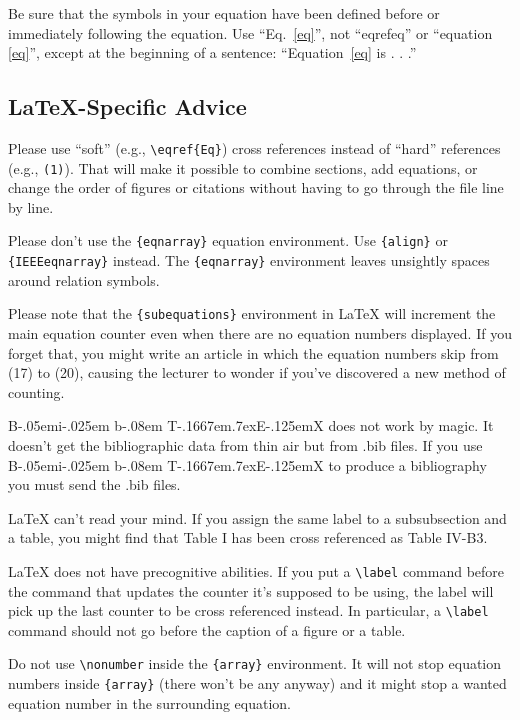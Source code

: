 \documentclass[conference]{IEEEtran}
\def\BibTeX{{\rm B\kern-.05em{\sc i\kern-.025em b}\kern-.08em
    T\kern-.1667em\lower.7ex\hbox{E}\kern-.125emX}}
\begin{document}
Be sure that the symbols in your equation have been defined before or immediately following the equation. Use ``Eq.~\eqref{eq}'', not ``eqref{eq}'' or ``equation \eqref{eq}'', except at 
the beginning of a sentence: ``Equation~\eqref{eq} is . . .''

\subsection{\LaTeX-Specific Advice}

Please use ``soft'' (e.g., \verb|\eqref{Eq}|) cross references instead
of ``hard'' references (e.g., \verb|(1)|). That will make it possible
to combine sections, add equations, or change the order of figures or
citations without having to go through the file line by line.

Please don't use the \verb|{eqnarray}| equation environment. Use
\verb|{align}| or \verb|{IEEEeqnarray}| instead. The \verb|{eqnarray}|
environment leaves unsightly spaces around relation symbols.

Please note that the \verb|{subequations}| environment in {\LaTeX}
will increment the main equation counter even when there are no
equation numbers displayed. If you forget that, you might write an
article in which the equation numbers skip from (17) to (20), causing
the lecturer to wonder if you've discovered a new method of
counting.

{\BibTeX} does not work by magic. It doesn't get the bibliographic
data from thin air but from .bib files. If you use {\BibTeX} to produce a bibliography you must send the .bib files. 

{\LaTeX} can't read your mind. If you assign the same label to a
subsubsection and a table, you might find that Table I has been cross
referenced as Table IV-B3. 

{\LaTeX} does not have precognitive abilities. If you put a
\verb|\label| command before the command that updates the counter it's supposed to be using, the label will pick up the last counter to be
cross referenced instead. In particular, a \verb|\label| command
should not go before the caption of a figure or a table.

Do not use \verb|\nonumber| inside the \verb|{array}| environment. It will not stop equation numbers inside \verb|{array}| (there won't be any anyway) and it might stop a wanted equation number in the
surrounding equation.
\end{document}
